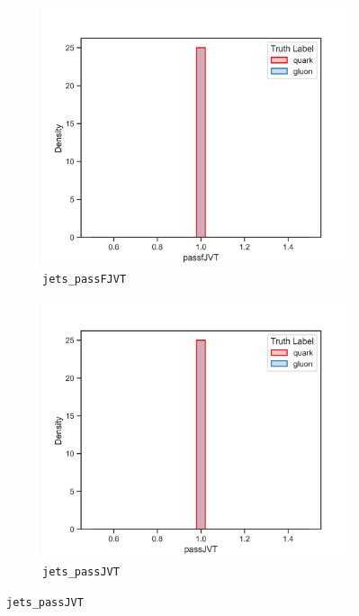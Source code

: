 \begin{figure}[!htb]
\begin{subfigure}[t]{0.48\textwidth}
	\end{subfigure}
	\begin{subfigure}[t]{0.48\textwidth}
		\includegraphics[width=1\textwidth]{src/plots/distributions/highlevel/jets_passFJVT.png}
		\caption{\texttt{jets\_passFJVT}}
		\label{fig:highlevel_26}
	\end{subfigure}
	\begin{subfigure}[t]{0.48\textwidth}
		\includegraphics[width=1\textwidth]{src/plots/distributions/highlevel/jets_passJVT.png}
		\caption{\texttt{jets\_passJVT}}
		\label{fig:highlevel_27}

\end{subfigure}
\end{figure}
